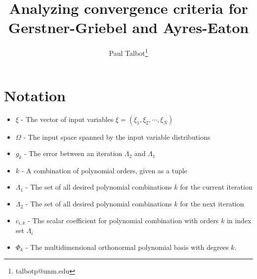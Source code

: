 \documentclass[11pt]{article}
\begin{document}
\title{Analyzing convergence criteria for Gerstner-Griebel and Ayres-Eaton}

\author[]{Paul Talbot\thanks{talbotp@unm.edu}}
\date{}
\renewcommand\Authands{ and }
\maketitle
\section{Notation}
\begin{itemize}
\item $\xi$ - The vector of input variables $\xi=(\xi_1,\xi_2,\cdots,\xi_N)$
\item $\Omega$ - The input space spanned by the input variable distributions
\item $g_k$ - The error between an iteration $\Lambda_2$ and $\Lambda_1$
\item $k$ - A combination of polynomial orders, given as a tuple
\item $\Lambda_1$ - The set of all desired polynomial combinations $k$ for the current iteration
\item $\Lambda_2$ - The set of all desired polynomial combinations $k$ for the next iteration
\item $c_{i,k}$ - The scalar coefficient for polynomial combination with orders $k$ in index set $\Lambda_i$
\item $\Phi_k$ - The multidimensional orthonormal polynomial basis with degrees $k$.
\end{itemize}
\end{document}
